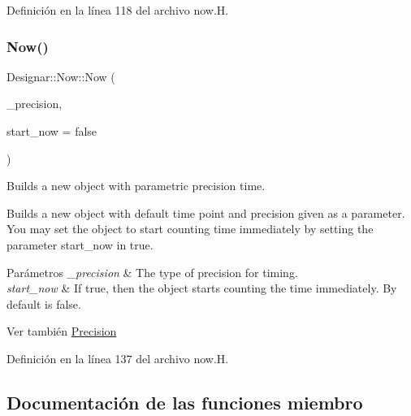 Definición en la línea 118 del archivo now.\+H.

\mbox{\label{class_designar_1_1_now_ac98ba684b09b3ed28d8a615d59c01aa2}} 
\subsubsection{\texorpdfstring{Now()}{Now()}\hspace{0.1cm}{\footnotesize\ttfamily [2/2]}}
{\footnotesize\ttfamily Designar\+::\+Now\+::\+Now (\begin{DoxyParamCaption}\item[{const \hyperlink{class_designar_1_1_now_a3c9f5e57907c88cbe63c70a64638c072}{Precision} \&}]{\+\_\+precision,  }\item[{bool}]{start\+\_\+now = {\ttfamily false} }\end{DoxyParamCaption})\hspace{0.3cm}{\ttfamily [inline]}}



Builds a new object with parametric precision time. 

Builds a new object with default time point and precision given as a parameter. You may set the object to start counting time immediately by setting the parameter start\+\_\+now in true.


\begin{DoxyParams}{Parámetros}
{\em \+\_\+precision} & The type of precision for timing. \\
\hline
{\em start\+\_\+now} & If true, then the object starts counting the time immediately. By default is false.\\
\hline
\end{DoxyParams}
\begin{DoxySeeAlso}{Ver también}
\hyperlink{class_designar_1_1_now_a3c9f5e57907c88cbe63c70a64638c072}{Precision} 
\end{DoxySeeAlso}


Definición en la línea 137 del archivo now.\+H.



\subsection{Documentación de las funciones miembro}
\mbox{\label{class_designar_1_1_now_aa140dcc748ca53e2c42548d50273bfaa}} 
